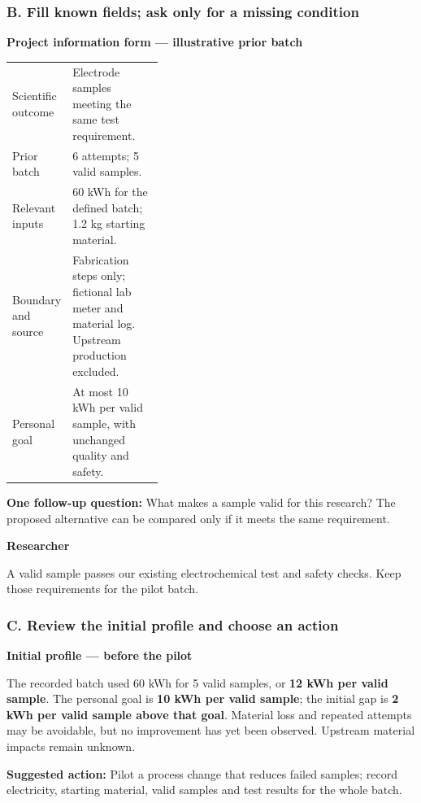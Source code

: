 \documentclass[11pt,a4paper]{article}
\begin{document}
\subsubsection*{B. Fill known fields; ask only for a missing condition}
\begin{assessscreen}
\textbf{Project information form --- illustrative prior batch}\par
\begin{tabularx}{\linewidth}{@{}>{\raggedright\arraybackslash}p{0.37\linewidth}X@{}}
Scientific outcome & Electrode samples meeting the same test requirement. \\
Prior batch & 6 attempts; 5 valid samples. \\
Relevant inputs & 60 kWh for the defined batch; 1.2 kg starting material. \\
Boundary and source & Fabrication steps only; fictional lab meter and material log. Upstream production excluded. \\
Personal goal & At most 10 kWh per valid sample, with unchanged quality and safety. \\
\end{tabularx}
\medskip{}\quad
{}\quad
{}
\end{assessscreen}

\begin{assessscreen}
\textbf{One follow-up question:} What makes a sample valid for this research? The proposed alternative can be compared only if it meets the same requirement.
\end{assessscreen}
\begin{flushright}\begin{assessuser}
\textbf{Researcher}\par
A valid sample passes our existing electrochemical test and safety checks. Keep those requirements for the pilot batch.
\end{assessuser}\end{flushright}

\subsubsection*{C. Review the initial profile and choose an action}
\begin{assessscreen}
\textbf{Initial profile --- before the pilot}\par
The recorded batch used 60 kWh for 5 valid samples, or \textbf{12 kWh per valid sample}. The personal goal is \textbf{10 kWh per valid sample}; the initial gap is \textbf{2 kWh per valid sample above that goal}. Material loss and repeated attempts may be avoidable, but no improvement has yet been observed. Upstream material impacts remain unknown.\par\medskip
\textbf{Suggested action:} Pilot a process change that reduces failed samples; record electricity, starting material, valid samples and test results for the whole batch.\par\medskip
{}\quad
{}\quad
{}\quad
{}
\end{assessscreen}
\end{document}

